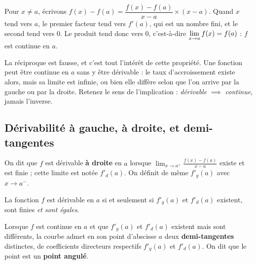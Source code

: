 \begin{demonstration}
Pour $x \neq a$, écrivons
$f(x) - f(a) = \dfrac{f(x)-f(a)}{x-a} \times (x-a)$.
Quand $x$ tend vers $a$, le premier facteur tend vers $f'(a)$, qui est un
nombre fini, et le second tend vers $0$. Le produit tend donc vers $0$,
c'est-à-dire $\limx{a} f(x) = f(a)$ : $f$ est continue en $a$.
\end{demonstration}

\begin{avertissement}
La réciproque est fausse, et c'est tout l'intérêt de cette propriété. Une
fonction peut être continue en $a$ sans y être dérivable : le taux
d'accroissement existe alors, mais sa limite est infinie, ou bien elle diffère
selon que l'on arrive par la gauche ou par la droite. Retenez le sens de
l'implication : \emph{dérivable} $\implies$ \emph{continue}, jamais l'inverse.
\end{avertissement}

\subsection{Dérivabilité à gauche, à droite, et demi-tangentes}

\begin{definition}
On dit que $f$ est dérivable \textbf{à droite} en $a$ lorsque
$\displaystyle\lim_{x \to a^{+}} \frac{f(x)-f(a)}{x-a}$ existe et est finie ;
cette limite est notée $f'_{d}(a)$. On définit de même $f'_{g}(a)$ avec
$x \to a^{-}$.

La fonction $f$ est dérivable en $a$ si et seulement si $f'_{g}(a)$ et
$f'_{d}(a)$ existent, sont finies \emph{et sont égales}.
\end{definition}

\begin{definition}
Lorsque $f$ est continue en $a$ et que $f'_{g}(a)$ et $f'_{d}(a)$ existent
mais sont différents, la courbe admet en son point d'abscisse $a$ deux
\textbf{demi-tangentes} distinctes, de coefficients directeurs respectifs
$f'_{g}(a)$ et $f'_{d}(a)$. On dit que le point est un \textbf{point angulé}.
\end{definition}

